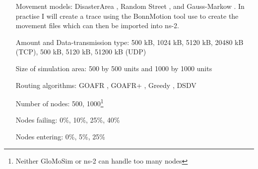 \begin{itemize}
\item[Movement models:] DisasterArea \cite{disasterArea},  Random Street \cite{randomStreet}, and Gauss-Markow . In practise I will create a trace using the BonnMotion tool \cite{toilers} use to create the movement files which can then be imported into ns-2.
\item[Amount and Data-transmission type:] 500 kB, 1024 kB, 5120 kB, 20480 kB (TCP), 500 kB, 5120 kB, 51200 kB (UDP)
\item[Size of simulation area:] 500 by 500 units and 1000 by 1000 units
\item[Routing algorithms:] GOAFR \cite{gopher}, GOAFR+ \cite{gopher+}, Greedy \cite{gopher}, DSDV 
\item[Number of nodes:] 500, 1000\footnote{Neither GloMoSim or ns-2 can handle too many nodes }
\item[Nodes failing:] 0\%, 10\%, 25\%, 40\%
\item[Nodes entering:] 0\%, 5\%, 25\%
\end{itemize}
